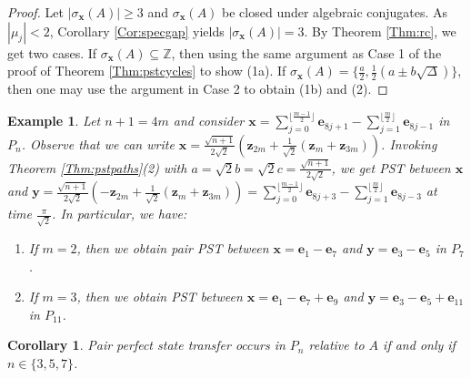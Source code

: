 \documentclass[11pt]{article}
\newtheorem{corollary}[theorem]{Corollary}
\newtheorem{example}[theorem]{Example}
\newcommand{\be}{\mathbf e}
\newcommand{\bx}{\mathbf x}
\newcommand{\by}{\mathbf y}
\newcommand{\bz}{\mathbf z}
\begin{document}
\begin{proof}
Let $|\sigma_{\bx}(A)|\geq 3$ and $\sigma_{\bx}(A)$ be closed under algebraic conjugates. As $|\mu_j|<2$, Corollary \ref{Cor:specgap} yields $|\sigma_{\bx}(A)|=3$. By Theorem \ref{Thm:rc}, we get two cases. If $\sigma_{\bx}(A)\subseteq\mathbb{Z}$, then using the same argument as Case 1 of the proof of Theorem \ref{Thm:pstcycles} to show (1a). If $\sigma_{\bx}(A)=\{\frac{a}{2},\frac{1}{2}(a\pm b\sqrt{\Delta})\}$, then one may use the argument in Case 2 to obtain (1b) and (2).
\end{proof}

\begin{example}
\label{Ex:pnex}
Let $n+1=4m$ and consider $\bx=\sum_{j=0}^{\lfloor\frac{m-1}{2}\rfloor}\be_{8j+1}-\sum_{j=1}^{\lfloor\frac{m}{2}\rfloor}\be_{8j-1}$ in $P_{n}$. Observe that we can write $\bx=\frac{\sqrt{n+1}}{2\sqrt{2}}(\bz_{2m}+\frac{1}{\sqrt{2}}(\bz_{m}+\bz_{3m}))$. Invoking Theorem \ref{Thm:pstpaths}(2) with $a=\sqrt{2}b=\sqrt{2}c=\frac{\sqrt{n+1}}{2\sqrt{2}}$, we get PST between $\bx$ and $\by=\frac{\sqrt{n+1}}{2\sqrt{2}}(-\bz_{2m}+\frac{1}{\sqrt{2}}(\bz_{m}+\bz_{3m}))=\sum_{j=0}^{\lfloor\frac{m-1}{2}\rfloor}\be_{8j+3}-\sum_{j=1}^{\lfloor\frac{m}{2}\rfloor}\be_{8j-3}$ at time $\frac{\pi}{\sqrt{2}}$. In particular, we have:
\begin{enumerate}
\item If $m=2$, then we obtain pair PST between $\bx=\be_1-\be_7$ and $\by=\be_3-\be_5$ in $P_7$.
\item If $m=3$, then we obtain PST between $\bx=\be_1-\be_7+\be_9$ and $\by=\be_3-\be_5+\be_{11}$ in $P_{11}$.
\end{enumerate}
\end{example}

\begin{corollary}
\label{Cor:pairpstpn}
Pair perfect state transfer occurs in $P_n$ relative to $A$ if and only if $n\in\{3,5,7\}$.
\end{corollary}
\end{document}
